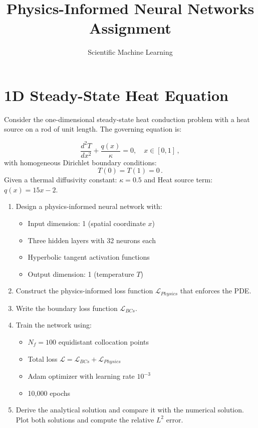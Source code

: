 \documentclass[11pt]{article}
\title{\textbf{Physics-Informed Neural Networks Assignment}}
\author{Scientific Machine Learning}
\date{}
\begin{document}
	\maketitle
	\hrulefill
	
	\section{1D Steady-State Heat Equation}
	Consider the one-dimensional steady-state heat conduction problem with a heat source on a rod of unit length. The governing equation is:
	
	\begin{equation*}
		\frac{d^2T}{dx^2} + \frac{q(x)}{\kappa} = 0, \quad x \in [0,1]\,,
	\end{equation*}
	with homogeneous Dirichlet boundary conditions:
	\begin{equation*}
		T(0) = T(1) = 0\,.
	\end{equation*}
	Given a thermal diffusivity constant: $\kappa = 0.5$
	and Heat source term: $q(x) = 15x - 2$.
	
	\begin{enumerate}
		\item[\textbf{a)}] Design a physics-informed neural network with:
		\begin{itemize}
			\item Input dimension: 1 (spatial coordinate $x$)
			\item Three hidden layers with 32 neurons each
			\item Hyperbolic tangent activation functions
			\item Output dimension: 1 (temperature $T$)
		\end{itemize}
		
		\item[\textbf{b)}] Construct the physics-informed loss function $\mathcal{L}_{Physics}$ that enforces the PDE.
		
		\item[\textbf{c)}] Write the boundary loss function $\mathcal{L}_{BCs}$.
		
		\item[\textbf{d)}] Train the network using:
		\begin{itemize}
			\item $N_f = 100$ equidistant collocation points
			\item Total loss $\mathcal{L} = \mathcal{L}_{BCs} + \mathcal{L}_{Physics}$
			\item Adam optimizer with learning rate $10^{-3}$
			\item 10,000 epochs
		\end{itemize}
		
		\item[\textbf{e)}] Derive the analytical solution and compare it with the numerical solution. Plot both solutions and compute the relative $L^2$ error.
	\end{enumerate}
	
\end{document}
